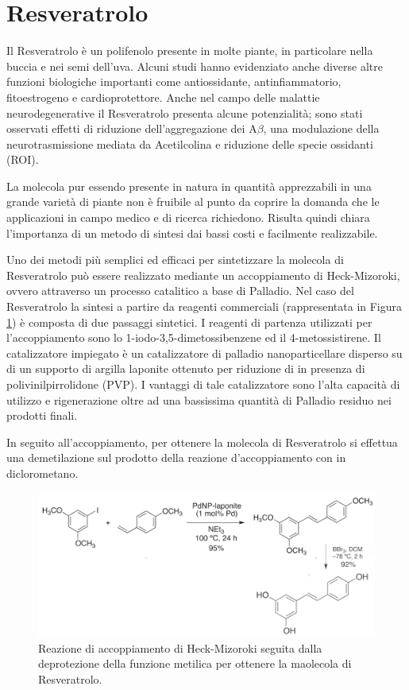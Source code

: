 \documentclass[a4paper, 11pt]{article}
\begin{document}
\section{Resveratrolo}
\label{sec:resv}
Il Resveratrolo è un polifenolo presente in molte piante, in particolare nella buccia e nei semi dell'uva. Alcuni studi hanno evidenziato anche diverse altre funzioni biologiche importanti come antiossidante, antinfiammatorio, fitoestrogeno e cardioprotettore. Anche nel campo delle malattie neurodegenerative il Resveratrolo presenta alcune potenzialità; sono stati osservati effetti di riduzione dell'aggregazione dei A$\beta$, una modulazione della neurotrasmissione mediata da Acetilcolina e riduzione delle specie ossidanti (ROI). \cite{jabir_cholinesterase_2018}

La molecola pur essendo presente in natura in quantità apprezzabili in una grande varietà di piante non è fruibile al punto da coprire la domanda che le applicazioni in campo medico e di ricerca richiedono. Risulta quindi chiara l'importanza di un metodo di sintesi dai bassi costi e facilmente realizzabile.

Uno dei metodi più semplici ed efficaci per sintetizzare la molecola di Resveratrolo può essere realizzato mediante un accoppiamento di Heck-Mizoroki, ovvero attraverso un processo catalitico a base di Palladio.
Nel caso del Resveratrolo la sintesi a partire da reagenti commerciali (rappresentata in Figura \ref{fig:totale_resveratrolo}) è composta di due passaggi sintetici. I reagenti di partenza utilizzati per l'accoppiamento sono lo 1-iodo-3,5-dimetossibenzene ed il 4-metossistirene. Il catalizzatore impiegato è un catalizzatore di palladio nanoparticellare disperso su di un supporto di argilla laponite ottenuto per riduzione di  in presenza di polivinilpirrolidone (PVP). \cite{martinez_extremely_2015}
I vantaggi di tale catalizzatore sono l'alta capacità di utilizzo e rigenerazione oltre ad una bassissima quantità di Palladio residuo nei prodotti finali.

In seguito all'accoppiamento, per ottenere la molecola di Resveratrolo si effettua una demetilazione sul prodotto della reazione d'accoppiamento con  in diclorometano. \cite{alejandro_v._martinez_expedient_2017}

\begin{figure}[H]
	\centering
	\includegraphics[width=.7\linewidth]{immagini/totale_resveratrolo.png}
	\caption{Reazione di accoppiamento di Heck-Mizoroki seguita dalla deprotezione della funzione metilica per ottenere la maolecola di Resveratrolo.}
	\label{fig:totale_resveratrolo}
\end{figure}
\end{document}
